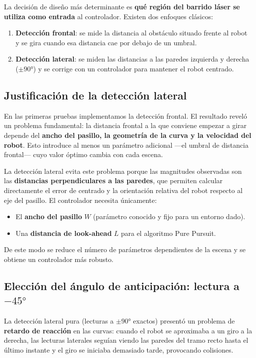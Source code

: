 \documentclass[12pt]{article}
\begin{document}
La decisión de diseño más determinante es \textbf{qué región del barrido láser se utiliza como entrada} al controlador. Existen dos enfoques clásicos:

\begin{enumerate}[leftmargin=2em]
  \item \textbf{Detección frontal}: se mide la distancia al obstáculo situado frente al robot y se gira cuando esa distancia cae por debajo de un umbral.
  \item \textbf{Detección lateral}: se miden las distancias a las paredes izquierda y derecha ($\pm 90°$) y se corrige con un controlador para mantener el robot centrado.
\end{enumerate}

\subsection{Justificación de la detección lateral}
En las primeras pruebas implementamos la detección frontal. El resultado reveló un problema fundamental: la distancia frontal a la que conviene empezar a girar depende del \textbf{ancho del pasillo, la geometría de la curva y la velocidad del robot}. Esto introduce al menos un parámetro adicional ---el umbral de distancia frontal--- cuyo valor óptimo cambia con cada escena.

La detección lateral evita este problema porque las magnitudes observadas son las \textbf{distancias perpendiculares a las paredes}, que permiten calcular directamente el error de centrado y la orientación relativa del robot respecto al eje del pasillo. El controlador necesita únicamente:
\begin{itemize}[leftmargin=2em]
  \item El \textbf{ancho del pasillo} $W$ (parámetro conocido y fijo para un entorno dado).
  \item Una \textbf{distancia de look-ahead} $L$ para el algoritmo Pure Pursuit.
\end{itemize}

De este modo se reduce el número de parámetros dependientes de la escena y se obtiene un controlador más robusto.

\subsection{Elección del ángulo de anticipación: lectura a $-45°$}
La detección lateral pura (lecturas a $\pm 90°$ exactos) presentó un problema de \textbf{retardo de reacción} en las curvas: cuando el robot se aproximaba a un giro a la derecha, las lecturas laterales seguían viendo las paredes del tramo recto hasta el último instante y el giro se iniciaba demasiado tarde, provocando colisiones.
\end{document}
